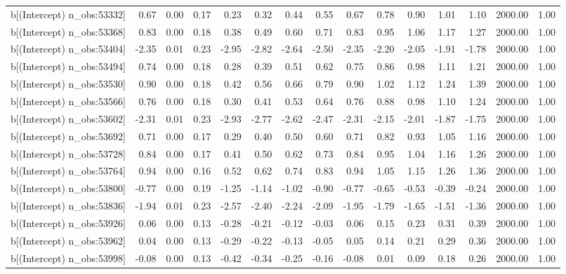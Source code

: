 \begin{table}[ht]
\begin{tabular}{rrrrrrrrrrrrrrr}
  b[(Intercept) n\_obs:53332] & 0.67 & 0.00 & 0.17 & 0.23 & 0.32 & 0.44 & 0.55 & 0.67 & 0.78 & 0.90 & 1.01 & 1.10 & 2000.00 & 1.00 \\ 
  b[(Intercept) n\_obs:53368] & 0.83 & 0.00 & 0.18 & 0.38 & 0.49 & 0.60 & 0.71 & 0.83 & 0.95 & 1.06 & 1.17 & 1.27 & 2000.00 & 1.00 \\ 
  b[(Intercept) n\_obs:53404] & -2.35 & 0.01 & 0.23 & -2.95 & -2.82 & -2.64 & -2.50 & -2.35 & -2.20 & -2.05 & -1.91 & -1.78 & 2000.00 & 1.00 \\ 
  b[(Intercept) n\_obs:53494] & 0.74 & 0.00 & 0.18 & 0.28 & 0.39 & 0.51 & 0.62 & 0.75 & 0.86 & 0.98 & 1.11 & 1.21 & 2000.00 & 1.00 \\ 
  b[(Intercept) n\_obs:53530] & 0.90 & 0.00 & 0.18 & 0.42 & 0.56 & 0.66 & 0.79 & 0.90 & 1.02 & 1.12 & 1.24 & 1.39 & 2000.00 & 1.00 \\ 
  b[(Intercept) n\_obs:53566] & 0.76 & 0.00 & 0.18 & 0.30 & 0.41 & 0.53 & 0.64 & 0.76 & 0.88 & 0.98 & 1.10 & 1.24 & 2000.00 & 1.00 \\ 
  b[(Intercept) n\_obs:53602] & -2.31 & 0.01 & 0.23 & -2.93 & -2.77 & -2.62 & -2.47 & -2.31 & -2.15 & -2.01 & -1.87 & -1.75 & 2000.00 & 1.00 \\ 
  b[(Intercept) n\_obs:53692] & 0.71 & 0.00 & 0.17 & 0.29 & 0.40 & 0.50 & 0.60 & 0.71 & 0.82 & 0.93 & 1.05 & 1.16 & 2000.00 & 1.00 \\ 
  b[(Intercept) n\_obs:53728] & 0.84 & 0.00 & 0.17 & 0.41 & 0.50 & 0.62 & 0.73 & 0.84 & 0.95 & 1.04 & 1.16 & 1.26 & 2000.00 & 1.00 \\ 
  b[(Intercept) n\_obs:53764] & 0.94 & 0.00 & 0.16 & 0.52 & 0.62 & 0.74 & 0.83 & 0.94 & 1.05 & 1.15 & 1.26 & 1.36 & 2000.00 & 1.00 \\ 
  b[(Intercept) n\_obs:53800] & -0.77 & 0.00 & 0.19 & -1.25 & -1.14 & -1.02 & -0.90 & -0.77 & -0.65 & -0.53 & -0.39 & -0.24 & 2000.00 & 1.00 \\ 
  b[(Intercept) n\_obs:53836] & -1.94 & 0.01 & 0.23 & -2.57 & -2.40 & -2.24 & -2.09 & -1.95 & -1.79 & -1.65 & -1.51 & -1.36 & 2000.00 & 1.00 \\ 
  b[(Intercept) n\_obs:53926] & 0.06 & 0.00 & 0.13 & -0.28 & -0.21 & -0.12 & -0.03 & 0.06 & 0.15 & 0.23 & 0.31 & 0.39 & 2000.00 & 1.00 \\ 
  b[(Intercept) n\_obs:53962] & 0.04 & 0.00 & 0.13 & -0.29 & -0.22 & -0.13 & -0.05 & 0.05 & 0.14 & 0.21 & 0.29 & 0.36 & 2000.00 & 1.00 \\ 
  b[(Intercept) n\_obs:53998] & -0.08 & 0.00 & 0.13 & -0.42 & -0.34 & -0.25 & -0.16 & -0.08 & 0.01 & 0.09 & 0.18 & 0.26 & 2000.00 & 1.00 \\ 

\end{tabular}
\end{table}
